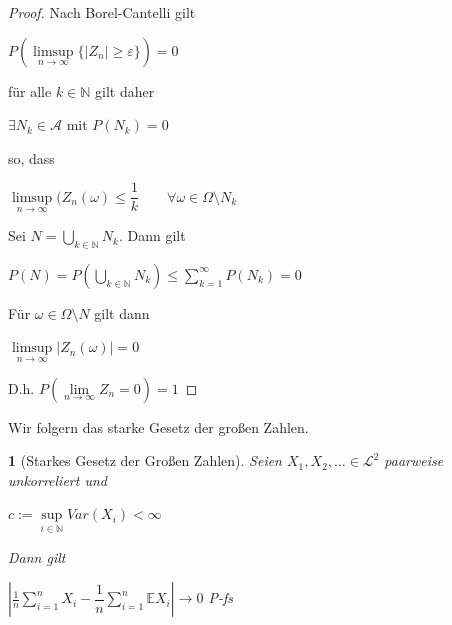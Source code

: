 \documentclass[10pt,a4paper]{report}
\numberwithin{equation}{section}
\numberwithin{figure}{section}
\theoremstyle{plain}
\theoremstyle{definition}
\theoremstyle{remark}
\theoremstyle{plain}
\newtheorem{prop}[thm]{\protect\propositionname}
\providecommand{\propositionname}{Satz}
\newcommand{\1}{ \mathbb{1} } %
\begin{document}
\begin{proof}
  Nach Borel-Cantelli gilt
  \begin{center}
    $P\left(\limsup\limits_{n \to \infty}\{|Z_n|\geq
      \varepsilon\}\right)=0$
  \end{center}
  für alle $k \in \mathbb{N}$ gilt daher
  \begin{center}
    $\exists N_k \in \mathcal{A}$ mit $P(N_k)=0$
  \end{center}
  so, dass
  \begin{center}
    $\limsup\limits_{n \to \infty} (Z_n(\omega)\leq \dfrac{1}{k}\qquad
    \forall\omega \in \Omega\setminus N_k$
  \end{center}
  Sei $N=\bigcup\limits_{k \in \mathbb{N}}N_k$. Dann gilt
  \begin{center}
    $P(N)=P\left(\bigcup\limits_{k \in \mathbb{N}}N_k\right)\leq
    \sum\limits_{k=1}^\infty P(N_k)=0$
  \end{center}
  Für $\omega \in \Omega\setminus N$ gilt dann
  \begin{center}
    $\limsup\limits_{n \to \infty} |Z_n(\omega)|=0$
  \end{center}
  D.h. $P\left(\lim\limits_{n \to \infty}Z_n=0\right)=1$ 
\end{proof}
Wir folgern das starke Gesetz der großen Zahlen. 
\begin{prop}[Starkes Gesetz der Großen Zahlen]
  Seien $X_1,X_2,\ldots \in \mathcal{L}^2$ paarweise unkorreliert und
  \begin{center}
    $c:=\sup\limits_{i \in \mathbb{N}} Var(X_i) < \infty$
  \end{center}
  Dann gilt
  \begin{center}
    $\left|\frac{1}{n}\sum\limits_{i=1}^nX_i-\dfrac{1}{n}\sum\limits_{i=1}^n\mathbb{E}X_i\right|
    \to 0$ P-fs
  \end{center}
\end{prop}
\end{document}

